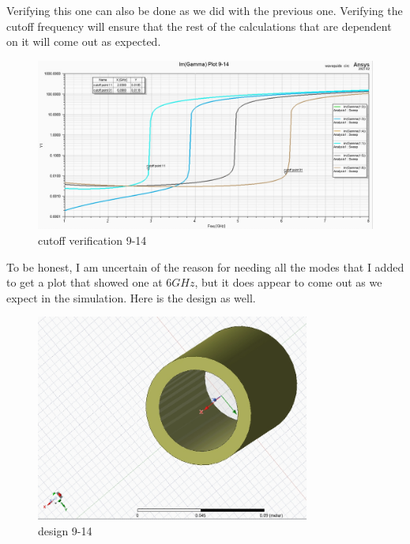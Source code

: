 \documentclass[12pt]{article}
\begin{document}
\newpage
Verifying this one can also be done as we did with the previous one. Verifying the cutoff frequency will ensure that the rest of the calculations that are dependent on it will come out as expected.
\begin{center}
\begin{figure}[h]
    \centering
    \includegraphics[width=18cm]{./images/im_gamma_plot_9-14.png}
    \caption{cutoff verification 9-14}
    \label{fig:9-14}
  \end{figure}
\end{center}
\vspace{-1cm}
To be honest, I am uncertain of the reason for needing all the modes that I added to get a plot that showed one at $6GHz$, but it does appear to come out as we expect in the simulation. Here is the design as well.
\vspace{-1cm}
\begin{center}
\begin{figure}[h]
    \centering
    \includegraphics[width=9cm]{./images/design_9-14.png}
    \caption{design 9-14}
    \label{fig:9-14des}
  \end{figure}
\end{center}


\newpage
\end{document}
